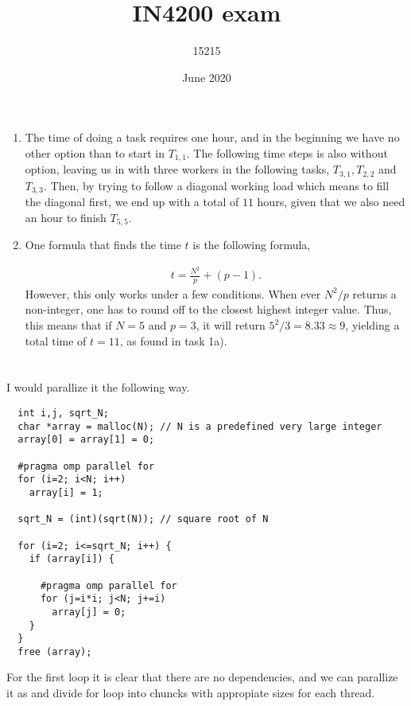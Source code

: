 \documentclass{article}
\title{IN4200 exam }
\author{15215}
\date{June 2020}
\begin{document}
\maketitle


\section{}
\begin{enumerate}[label=(\alph*)]
    \item
    The time of doing a task requires one hour, and in the beginning we have no other option than to start in $T_{1,1}$. The following time steps is also without option, leaving us in with three workers in the following tasks, $T_{3,1}, T_{2,2}$ and $T_{3,3}$. Then, by trying to follow a diagonal working load which means to fill the diagonal first, we end up with a total of $11$ hours, given that we also need an hour to finish $T_{5,5}$.
    \item
    One formula that finds the time $t$ is the following formula,

    \begin{align*}
      t = \frac{N^2}{p} + (p-1).
    \end{align*}
    However, this only works under a few conditions. When ever $N^2/p$ returns a non-integer, one has to round off to the closest highest integer value. Thus, this means that if $N=5$ and $p=3$, it will return $5^2/3 = 8.33 \approx 9$, yielding a total time of $t=11$, as found in task 1a).

\end{enumerate}

\section{}

I would parallize it the following way.
\begin{lstlisting}
  int i,j, sqrt_N;
  char *array = malloc(N); // N is a predefined very large integer
  array[0] = array[1] = 0;

  #pragma omp parallel for
  for (i=2; i<N; i++)
    array[i] = 1;

  sqrt_N = (int)(sqrt(N)); // square root of N

  for (i=2; i<=sqrt_N; i++) {
    if (array[i]) {

      #pragma omp parallel for
      for (j=i*i; j<N; j+=i)
        array[j] = 0;
    }
  }
  free (array);

\end{lstlisting}
For the first loop it is clear that there are no dependencies, and we can parallize it as and divide for loop into chuncks with appropiate sizes for each thread.
\end{document}
